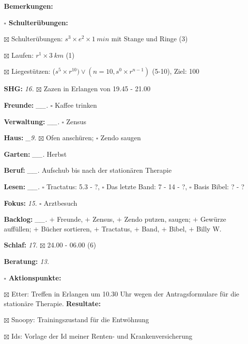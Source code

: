 \documentclass[10pt,a4paper]{article}
\newcommand\prop[1] {{\color {alizarin} {\bf #1}}}             %
\newcommand\opti[1] {{\color {amethyst} {\bf #1}}}             %
\newcommand\mand[1] {{\color {burntorange} {\bf #1}}}          %
\newcommand\topspace{\vskip -15pt \hskip 20pt}
\newcommand\bottomspace{\vskip 4pt}
\newcommand\n[1] { {\sl #1.} \hskip 5pt }
\begin{document}
\begin{mdframed}[style=daystyle]
\begin{labeling}{{\mand {Bemerkungen:}}}
\begin{minipage}{0.75\textwidth}
\begin{labeling}{\prop {$\square$ {Schulterübungen:}}}
      \item[$\boxtimes$ Schulterübungen:] $s^3 \times e^2 \times 1\ min$ mit Stange und Ringe (3)
      \item[$\boxtimes$ Laufen:]          $r^1 \times 3\ km$ (1)
      \item[$\boxtimes$ Liegestützen:]    ($s^5 \times r^{10}) \vee (n=10, s^0 \times r^{n-1})$ (5-10), Ziel: 100
      \end{labeling}
    \end{minipage}
    \bottomspace        
  \item[{\mand {SHG:}}]            \n{16} $\boxtimes$ Zazen in Erlangen von 19.45 - 21.00
  \item[{\mand {Freunde:}}]      \n{\_\_} $\square$ Kaffee trinken
  \item[{\mand {Verwaltung:}}]   \n{\_\_} $\square$ Zensus
  \item[{\mand {Haus:}}]          \n{\_9} $\boxtimes$ Ofen anschüren; $\square$ Zendo saugen
  \item[{\mand {Garten:}}]       \n{\_\_} Herbst
  \item[{\mand {Beruf:}}]        \n{\_\_} Aufschub bis nach der stationären Therapie
  \item[{\mand {Lesen:}}]        \n{\_\_} $\square$ Tractatus: 5.3 - ?,
      $\square$ Das letzte Band: 7 - 14 - ?, $\square$ Basis Bibel: ? - ?
  \item[{\mand {Fokus:}}]          \n{15} $\square$ Arztbesuch
  \item[{\mand {Backlog:}}]      \n{\_\_} $+$ Freunde,
    $+$ Zensus,
    $+$ Zendo putzen, saugen; $+$ Gewürze auffüllen; $+$ Bücher sortieren,
    $+$ Tractatus, $+$ Band, $+$ Bibel, $+$ Billy W.
  \item[{\mand {Schlaf:}}]         \n{17} $\boxtimes$ 24.00 - 06.00 (6)
  \item[{\opti {Beratung:}}]       \n{13} 
    \topspace
    \begin{minipage}{0.75\textwidth}  
      \begin{labeling}{\prop {$\square$ Aktionspunkte:}}
        \setlength\itemsep{-3pt}
      \item[$\boxtimes$ Etter:] Treffen in Erlangen um 10.30 Uhr wegen der
        Antragsformulare für die stationäre Therapie. {\bf Resultate:}
      \item[$\boxtimes$ Snoopy:]        Trainingszustand für die Entwöhnung
      \item[$\boxtimes$ Ids:]           Vorlage der Id meiner Renten- und Krankenversicherung

\end{labeling}
\end{minipage}
\end{labeling}
\end{mdframed}
\end{document}
